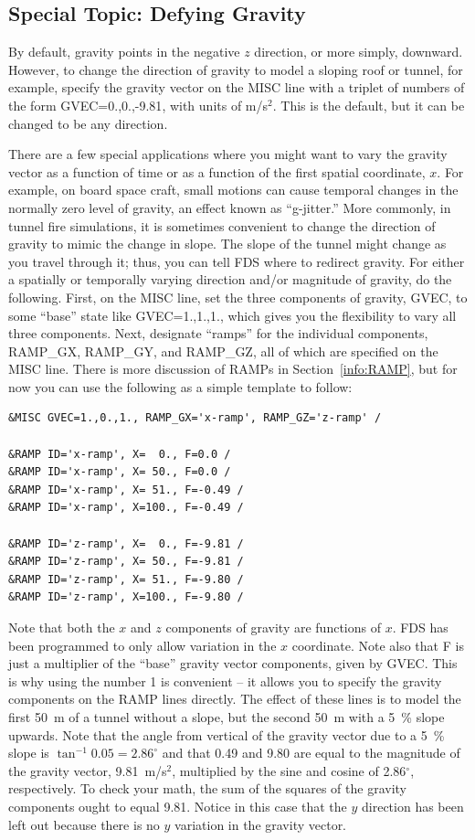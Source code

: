 \documentclass[11pt]{book}
\begin{document}
\subsection{Special Topic: Defying Gravity}
\label{info:GVEC}

By default, gravity points in the negative $z$ direction, or more simply, downward.
However, to change the direction of gravity to model
a sloping roof or tunnel, for example, specify the gravity
vector on the {\ct MISC} line with a triplet of numbers of the form
{\ct GVEC=0.,0.,-9.81},
with units of m/s$^2$. This is the default, but it
can be changed to be any direction.

There are a few special applications where you might want to vary the gravity vector as a function of time
or as a function of the first spatial coordinate, $x$. For example, on board space craft, small motions can
cause temporal changes in the normally zero level of gravity, an effect known as ``g-jitter.'' More commonly, in tunnel
fire simulations, it is sometimes convenient to change the direction of gravity to mimic the change in slope. The slope
of the tunnel might change as you travel through it; thus, you can tell FDS where to redirect gravity.
For either a spatially or temporally varying direction and/or magnitude of gravity, do the following. First, on the
{\ct MISC} line, set the three components of gravity, {\ct GVEC}, to some ``base'' state like {\ct GVEC=1.,1.,1.},
which gives you the flexibility to vary all three components. Next, designate ``ramps'' for the individual components, {\ct RAMP\_GX},
{\ct RAMP\_GY}, and {\ct RAMP\_GZ}, all of which are specified on the {\ct MISC} line. There is more discussion of
{\ct RAMP}s in Section~\ref{info:RAMP}, but for now you can use the following as a simple template to follow:
\begin{lstlisting}
&MISC GVEC=1.,0.,1., RAMP_GX='x-ramp', RAMP_GZ='z-ramp' /

&RAMP ID='x-ramp', X=  0., F=0.0 /
&RAMP ID='x-ramp', X= 50., F=0.0 /
&RAMP ID='x-ramp', X= 51., F=-0.49 /
&RAMP ID='x-ramp', X=100., F=-0.49 /

&RAMP ID='z-ramp', X=  0., F=-9.81 /
&RAMP ID='z-ramp', X= 50., F=-9.81 /
&RAMP ID='z-ramp', X= 51., F=-9.80 /
&RAMP ID='z-ramp', X=100., F=-9.80 /
\end{lstlisting}
Note that both the $x$ and $z$ components of gravity are functions of $x$. FDS has been programmed to only allow variation in the
$x$ coordinate. Note also that {\ct F} is just a multiplier of the ``base'' gravity vector components, given by {\ct GVEC}. This is why
using the number 1 is convenient -- it allows you to specify the gravity components on the {\ct RAMP} lines directly.
The effect of these lines is to model the first 50~m of a tunnel without a slope, but the second 50~m with a 5~\% slope
upwards. Note that the angle from vertical of the gravity vector due to a 5~\% slope is $\tan^{-1} 0.05=2.86^\circ$ and that
0.49 and 9.80 are equal to the magnitude of the gravity vector, 9.81~m/s$^2$, multiplied by the sine and cosine of 2.86$^\circ$,
respectively. To check your math, the sum of the squares of the gravity components ought to equal 9.81.
Notice in this case that the $y$ direction has been left out because there is no $y$ variation in the gravity vector.
\end{document}
